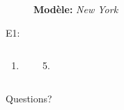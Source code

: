 \documentclass{beamer}
\begin{document}
  \begin{frame}{}
    
    \begin{description}
      \item[] \textbf{Modèle:} \textit{New York}
      \item[E1:] 
    \end{description}
    \begin{columns}[t]
        \begin{enumerate}
          \item 
        \end{enumerate}
        \begin{enumerate}
          \setcounter{enumi}{4}
          \item 
        \end{enumerate}
    \end{columns}
  \end{frame}

  \begin{frame}{}
    \begin{center}
      \Large Questions?
    \end{center}
  \end{frame}
\end{document}
